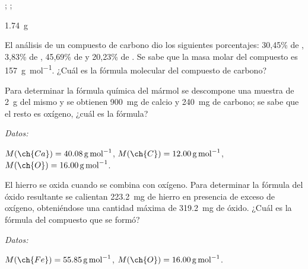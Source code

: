 \documentclass[10pt,a5paper,twoside]{article}
\newenvironment{gexdatos}{
      \vspace{2pt}
      \noindent\small\textit{Datos:}
    }{\vspace{5pt}}
\begin{document}
  \begin{solution}
    \begin{enumerate*}
      \item {}; ;
      \item \SI{1.74}{\gram}
    \end{enumerate*}
  \end{solution}




  \begin{exercise}[
      tags    = {termodinámica, entalpía, entalpia de reacción, calor},
      topics  = {química, termoquímica, termodinámica},
      source  = {FQ 1B OXF 2015, p43, e46},
    ]
    El análisis de un compuesto de carbono dio los siguientes porcentajes: 30,45\% de , 3,83\% de , 45,69\% de  y 20,23\% de . Se sabe que la masa molar del compuesto es \SI{157}{\gram\per\mole}. ¿Cuál es la fórmula molecular del compuesto de carbono?
  \end{exercise}

  \begin{solution}
  \end{solution}




  \begin{exercise}[
      tags    = {termodinámica, entalpía, entalpia de reacción, calor},
      topics  = {química, termoquímica, termodinámica},
      source  = {FQ 1B SAN 2015, p44, e52},
    ]
    Para determinar la fórmula química del mármol se descompone una muestra de \SI{2}{\gram} del mismo y se obtienen \SI{900}{\milli\gram} de calcio y \SI{240}{\milli\gram} de carbono; se sabe que el resto es oxígeno, ¿cuál es la fórmula?

    \begin{gexdatos}
      \( M(\ch{Ca}) = \SI{40.08}{\gram\per\mole} \),
      \( M(\ch{C}) = \SI{12.00}{\gram\per\mole} \),
      \( M(\ch{O}) = \SI{16.00}{\gram\per\mole} \).
    \end{gexdatos}
  \end{exercise}

  \begin{solution}
  \end{solution}




  \begin{exercise}[
      tags    = {termodinámica, entalpía, entalpia de reacción, calor},
      topics  = {química, termoquímica, termodinámica},
      source  = {FQ 1B SAN 2015, p44, e53},
    ]
    El hierro se oxida cuando se combina con oxígeno. Para determinar la fórmula del óxido resultante se calientan \SI{223.2}{\milli\gram} de hierro en presencia de exceso de oxígeno, obteniéndose una cantidad máxima de \SI{319.2}{\milli\gram} de óxido. ¿Cuál es la fórmula del compuesto que se formó?

    \begin{gexdatos}
      \( M(\ch{Fe}) = \SI{55.85}{\gram\per\mole} \),
      \( M(\ch{O}) = \SI{16.00}{\gram\per\mole} \).
    \end{gexdatos}
  \end{exercise}
\end{document}
